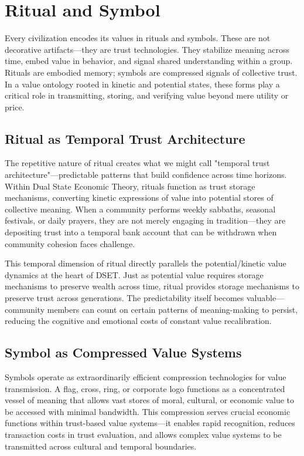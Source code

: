 \documentclass[11pt,oneside]{book}
\begin{document}
\chapter{ Ritual and Symbol}

Every civilization encodes its values in rituals and symbols. These are not decorative artifacts—they are trust technologies. They stabilize meaning across time, embed value in behavior, and signal shared understanding within a group. Rituals are embodied memory; symbols are compressed signals of collective trust. In a value ontology rooted in kinetic and potential states, these forms play a critical role in transmitting, storing, and verifying value beyond mere utility or price.

\section{Ritual as Temporal Trust Architecture}

The repetitive nature of ritual creates what we might call "temporal trust architecture"—predictable patterns that build confidence across time horizons. Within Dual State Economic Theory, rituals function as trust storage mechanisms, converting kinetic expressions of value into potential stores of collective meaning. When a community performs weekly sabbaths, seasonal festivals, or daily prayers, they are not merely engaging in tradition—they are depositing trust into a temporal bank account that can be withdrawn when community cohesion faces challenge.

This temporal dimension of ritual directly parallels the potential/kinetic value dynamics at the heart of DSET. Just as potential value requires storage mechanisms to preserve wealth across time, ritual provides storage mechanisms to preserve trust across generations. The predictability itself becomes valuable—community members can count on certain patterns of meaning-making to persist, reducing the cognitive and emotional costs of constant value recalibration.

\section{Symbol as Compressed Value Systems}

Symbols operate as extraordinarily efficient compression technologies for value transmission. A flag, cross, ring, or corporate logo functions as a concentrated vessel of meaning that allows vast stores of moral, cultural, or economic value to be accessed with minimal bandwidth. This compression serves crucial economic functions within trust-based value systems—it enables rapid recognition, reduces transaction costs in trust evaluation, and allows complex value systems to be transmitted across cultural and temporal boundaries.
\end{document}
